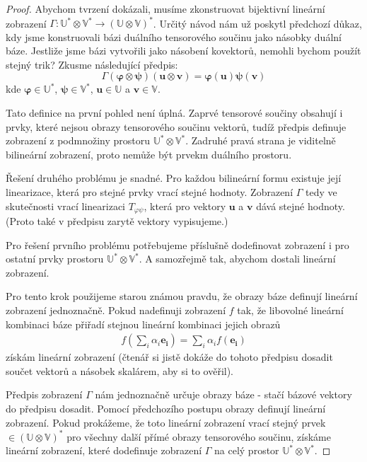 \documentclass[a5paper,12pt]{amsbook}
\theoremstyle{definition}
\newcommand{\myvec}[1]{\bm{#1}}
\newcommand{\myspace}[1]{\mathbb{#1}}
\begin{document}
\begin{proof}
Abychom tvrzení dokázali, musíme zkonstruovat bijektivní lineární zobrazení
$\Gamma: \myspace{U^*}\otimes\myspace{V^*}\rightarrow(\myspace{U}\otimes\myspace{V})^*$. Určitý
návod nám už poskytl předchozí důkaz, kdy jsme konstruovali bázi duálního tensorového součinu
jako násobky duální báze. Jestliže jsme bázi vytvořili jako násobení kovektorů, nemohli bychom
použít stejný trik? Zkusme následující předpis:
\begin{equation*}
\Gamma(\myvec{\varphi}\otimes\myvec{\psi})(\myvec{u}\otimes\myvec{v}) 
  = \myvec{\varphi}(\myvec{u})\myvec{\psi}(\myvec{v})
\end{equation*}
kde $\myvec{\varphi}\in\myspace{U^*}$, $\myvec{\psi}\in\myspace{V^*}$, $\myvec{u}\in\myspace{U}$
a $\myvec{v}\in\myspace{V}$.

Tato definice na první pohled není úplná. Zaprvé tensorové součiny obsahují i prvky,
které nejsou obrazy tensorového součinu vektorů, tudíž předpis definuje zobrazení z podmnožiny
prostoru $\myspace{U^*}\otimes\myspace{V^*}$. Zadruhé pravá strana je viditelně bilineární
zobrazení, proto nemůže být prvekm duálního prostoru.

Řešení druhého problému je snadné. Pro každou bilineární formu existuje její linearizace,
která pro stejné prvky vrací stejné hodnoty. Zobrazení $\Gamma$ tedy ve skutečnosti vrací
linearizaci $T_{\varphi\psi}$, která pro vektory $\myvec{u}$ a $\myvec{v}$ dává stejné
hodnoty. (Proto také v předpisu zarytě vektory vypisujeme.)

Pro řešení prvního problému potřebujeme příslušně dodefinovat zobrazení i pro ostatní prvky
prostoru $\myspace{U^*}\otimes\myspace{V^*}$. A samozřejmě tak, abychom dostali lineární
zobrazení.

Pro tento krok použijeme starou známou pravdu, že obrazy báze definují lineární zobrazení
jednoznačně. Pokud nadefinuji zobrazení $f$ tak, že libovolné lineární kombinaci báze
přiřadí stejnou lineární kombinaci jejich obrazů
\begin{equation*}
\begin{split}
f(\sum_i\alpha_i\myvec{e_i}) = \sum_i\alpha_i f(\myvec{e_i})
\end{split}
\end{equation*}
získám lineární zobrazení (čtenář si jistě dokáže do tohoto předpisu dosadit součet vektorů
a násobek skalárem, aby si to ověřil).

Předpis zobrazení $\Gamma$ nám jednoznačně určuje obrazy báze - stačí bázové vektory do předpisu
dosadit. Pomocí předchozího postupu obrazy definují lineární zobrazení. Pokud prokážeme, že
toto lineární zobrazení vrací stejný prvek $\in (\myspace{U}\otimes\myspace{V})^*$ pro všechny
další přímé obrazy tensorového součinu, získáme lineární zobrazení, které dodefinuje zobrazení
$\Gamma$ na celý prostor $\myspace{U^*}\otimes\myspace{V^*}$.


\end{proof}
\end{document}
